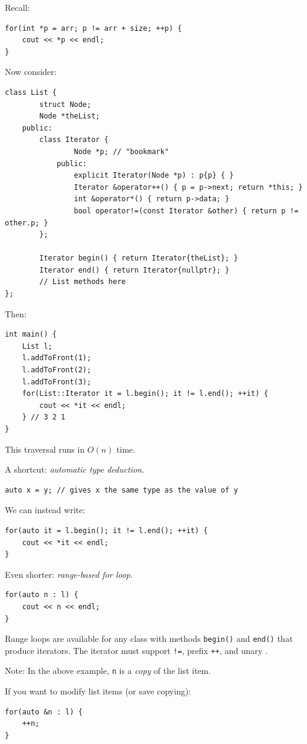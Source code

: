 \documentclass[11pt]{article}
\theoremstyle{definition}
\begin{document}
Recall:
\begin{lstlisting}
for(int *p = arr; p != arr + size; ++p) {
    cout << *p << endl;
}
\end{lstlisting}
\vspace{-0.25cm}
Now consider:
\begin{lstlisting}
class List {
        struct Node;
        Node *theList;
    public:
        class Iterator {
                Node *p; // "bookmark"
            public:
                explicit Iterator(Node *p) : p{p} { }
                Iterator &operator++() { p = p->next; return *this; }
                int &operator*() { return p->data; }
                bool operator!=(const Iterator &other) { return p != other.p; }
        };
        
        Iterator begin() { return Iterator{theList}; }
        Iterator end() { return Iterator{nullptr}; }
        // List methods here
};
\end{lstlisting}
\vspace{-0.25cm}
Then:
\begin{lstlisting}
int main() {
    List l;
    l.addToFront(1);
    l.addToFront(2);
    l.addToFront(3);
    for(List::Iterator it = l.begin(); it != l.end(); ++it) {
        cout << *it << endl;
    } // 3 2 1
}
\end{lstlisting}
This traversal runs in $O(n)$ time.

A shortcut: {\it automatic type deduction}.
\begin{lstlisting}
auto x = y; // gives x the same type as the value of y
\end{lstlisting}
We can instead write:
\begin{lstlisting}
for(auto it = l.begin(); it != l.end(); ++it) {
    cout << *it << endl;
}
\end{lstlisting}
Even shorter: {\it range-based for loop}.
\begin{lstlisting}
for(auto n : l) {
    cout << n << endl;
}
\end{lstlisting}
Range loops are available for any class with methods {\tt begin()} and {\tt end()} that produce iterators. The iterator must support {\tt !=}, prefix {\tt ++}, and unary {\tt *}.

Note: In the above example, {\tt n} is a {\it copy} of the list item. 

If you want to modify list items (or save copying):
\begin{lstlisting}
for(auto &n : l) {
    ++n;
}
\end{lstlisting}
\end{document}
